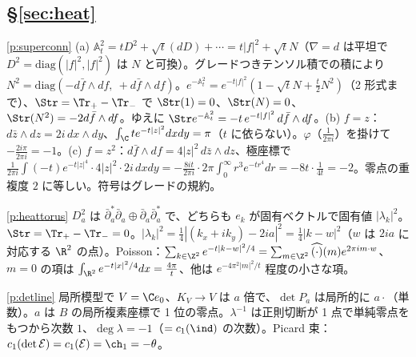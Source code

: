 \subsection*{\S\ref{sec:heat}}
\begin{sol}{\ref{p:superconn}}
(a) $\mathbb A_t^2=tD^2+\sqrt t(dD)+\cdots=t|f|^2+\sqrt tN$（$\nabla=d$ は平坦で $D^2=\mathrm{diag}(|f|^2,|f|^2)$ は $N$ と可換）。グレードつきテンソル積での積により $N^2=\mathrm{diag}(-d\bar f\wedge df,\ +d\bar f\wedge df)$。$e^{-\mathbb A_t^2}=e^{-t|f|^2}(1-\sqrt tN+\frac t2N^2)$（2 形式まで）、$\Str=\Tr_+-\Tr_-$ で $\Str(1)=0$、$\Str(N)=0$、$\Str(N^2)=-2d\bar f\wedge df$。ゆえに $\Str e^{-\mathbb A_t^2}=-t\,e^{-t|f|^2}\,d\bar f\wedge df$。(b) $f=z$：$d\bar z\wedge dz=2i\,dx\wedge dy$、$\int_\C te^{-t|z|^2}dxdy=\pi$（$t$ に依らない）。$\varphi$（$\frac1{2\pi i}$）を掛けて $-\frac{2i\pi}{2\pi i}=-1$。(c) $f=z^2$：$d\bar f\wedge df=4|z|^2\,d\bar z\wedge dz$、極座標で $\frac1{2\pi i}\int(-t)e^{-t|z|^4}\cdot4|z|^2\cdot2i\,dxdy=-\frac{8it}{2\pi i}\cdot2\pi\int_0^\infty r^3e^{-tr^4}dr=-8t\cdot\frac1{4t}=-2$。零点の重複度 $2$ に等しい。符号はグレードの規約\tQ。
\end{sol}
\begin{sol}{\ref{p:heattorus}}
$D_a^2$ は $\bar\partial_a^*\bar\partial_a\oplus\bar\partial_a\bar\partial_a^*$ で、どちらも $e_k$ が固有ベクトルで固有値 $|\lambda_k|^2$。$\Str=\Tr_+-\Tr_-=0$。$|\lambda_k|^2=\frac14|(k_x+ik_y)-2ia|^2=\frac14|k-w|^2$（$w$ は $2ia$ に対応する $\R^2$ の点）。Poisson：$\sum_{k\in\Z^2}e^{-t|k-w|^2/4}=\sum_{m\in\Z^2}\widehat{(\cdot)}(m)e^{2\pi im\cdot w}$、$m=0$ の項は $\int_{\R^2}e^{-t|x|^2/4}dx=\frac{4\pi}t$、他は $e^{-4\pi^2|m|^2/t}$ 程度の小さな項。
\end{sol}
\begin{sol}{\ref{p:detline}}
局所模型で $V=\C e_0$、$K_V\to V$ は $a$ 倍で、$\det P_a$ は局所的に $a\cdot$（単数）。$a$ は $B$ の局所複素座標で 1 位の零点。$\lambda^{-1}$ は正則切断が 1 点で単純零点をもつから次数 $1$、$\deg\lambda=-1$（$=c_1(\ind)$ の次数）。Picard 束：$c_1(\det\mathcal E)=c_1(\mathcal E)=\ch_1=-\theta$。
\end{sol}
